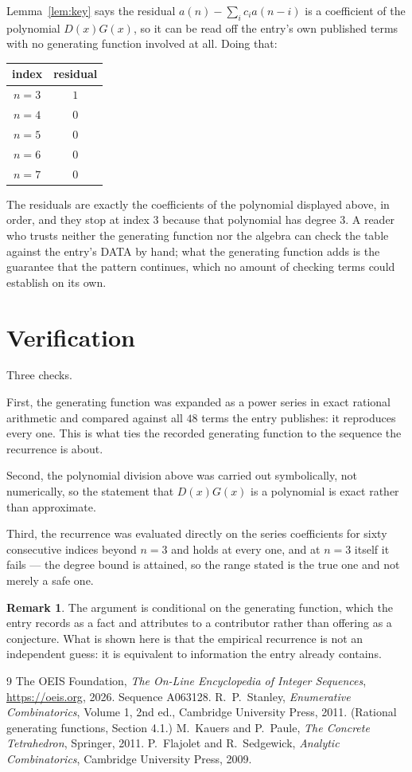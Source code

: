 \documentclass[11pt,a4paper]{article}
\theoremstyle{plain}
\theoremstyle{definition}
\newtheorem{remark}[theorem]{Remark}
\begin{document}
Lemma~\ref{lem:key} says the residual $a(n)-\sum_ic_ia(n-i)$ is a coefficient of the
polynomial $D(x)G(x)$, so it can be read off the entry's own published terms with no
generating function involved at all. Doing that:
\begin{center}
\begin{tabular}{cc}
index & residual \\ \hline
$n=3$ & $1$ \\
$n=4$ & $0$ \\
$n=5$ & $0$ \\
$n=6$ & $0$ \\
$n=7$ & $0$
\end{tabular}
\end{center}
The residuals are exactly the coefficients of the polynomial displayed above, in order, and
they stop at index $3$ because that polynomial has degree $3$. A reader who trusts
neither the generating function nor the algebra can check the table against the entry's DATA
by hand; what the generating function adds is the guarantee that the pattern continues, which
no amount of checking terms could establish on its own.

\section{Verification}

Three checks.

First, the generating function was expanded as a power series in exact rational arithmetic and
compared against all $48$ terms the entry publishes: it reproduces every one. This is
what ties the recorded generating function to the sequence the recurrence is about.

Second, the polynomial division above was carried out symbolically, not numerically, so the
statement that $D(x)G(x)$ is a polynomial is exact rather than approximate.

Third, the recurrence was evaluated directly on the series coefficients for sixty consecutive
indices beyond $n=3$ and holds at every one, and at $n=3$ itself it fails --- the
degree bound is attained, so the range stated is the true one and not merely a safe one.

\begin{remark}
The argument is conditional on the generating function, which the entry records as a fact and
attributes to a contributor rather than offering as a conjecture. What is shown here is that
the empirical recurrence is not an independent guess: it is equivalent to information the
entry already contains.
\end{remark}

\begin{thebibliography}{9}
 The OEIS Foundation, \emph{The On-Line Encyclopedia of Integer
Sequences}, \url{https://oeis.org}, 2026. Sequence A063128.
 R.~P.~Stanley, \emph{Enumerative Combinatorics}, Volume 1, 2nd ed.,
Cambridge University Press, 2011. (Rational generating functions, Section 4.1.)
 M.~Kauers and P.~Paule, \emph{The Concrete Tetrahedron}, Springer, 2011.
 P.~Flajolet and R.~Sedgewick, \emph{Analytic Combinatorics}, Cambridge
University Press, 2009.
\end{thebibliography}
\end{document}
